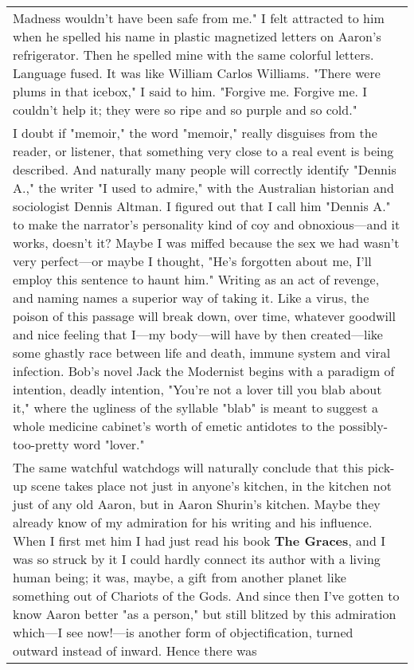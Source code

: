 \begin{longtable}[]{@{}l@{}}
\begin{minipage}[t]{0.97\columnwidth}
Madness wouldn't have been safe from me." I felt attracted to him when
he spelled his name in plastic magnetized letters on Aaron's
refrigerator. Then he spelled mine with the same colorful letters.
Language fused. It was like William Carlos Williams. "There were plums
in that icebox," I said to him. "Forgive me. Forgive me. I couldn't help
it; they were so ripe and so purple and so cold."\strut
\end{minipage}\tabularnewline
\begin{minipage}[t]{0.97\columnwidth}\raggedright
I doubt if "memoir," the word "memoir," really disguises from the
reader, or listener, that something very close to a real event is being
described. And naturally many people will correctly identify "Dennis
A.," the writer "I used to admire," with the Australian historian and
sociologist Dennis Altman. I figured out that I call him "Dennis A." to
make the narrator's personality kind of coy and obnoxious---and it
works, doesn't it? Maybe I was miffed because the sex we had wasn't very
perfect---or maybe I thought, "He's forgotten about me, I'll employ this
sentence to haunt him." Writing as an act of revenge, and naming names a
superior way of taking it. Like a virus, the poison of this passage will
break down, over time, whatever goodwill and nice feeling that I---my
body---will have by then created---like some ghastly race between life
and death, immune system and viral infection. Bob's novel Jack the
Modernist begins with a paradigm of intention, deadly intention, "You're
not a lover till you blab about it," where the ugliness of the syllable
"blab" is meant to suggest a whole medicine cabinet's worth of emetic
antidotes to the possibly-too-pretty word "lover."\strut
\end{minipage}\tabularnewline
\begin{minipage}[t]{0.97\columnwidth}\raggedright
The same watchful watchdogs will naturally conclude that this pick-up
scene takes place not just in anyone's kitchen, in the kitchen not just
of any old Aaron, but in Aaron Shurin's kitchen. Maybe they already know
of my admiration for his writing and his influence. When I first met him
I had just read his book \textbf{The Graces}, and I was so struck by it
I could hardly connect its author with a living human being; it was,
maybe, a gift from another planet like something out of Chariots of the
Gods. And since then I've gotten to know Aaron better "as a person," but
still blitzed by this admiration which---I see now!---is another form of
objectification, turned outward instead of inward. Hence there was

\end{minipage}
\end{longtable}
